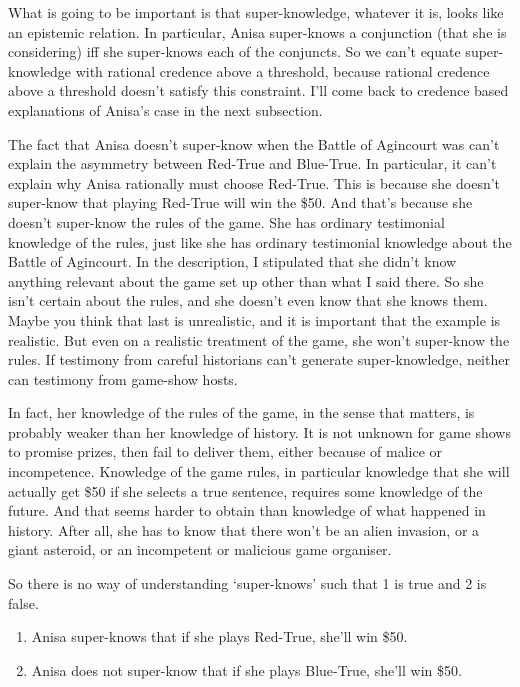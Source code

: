 \documentclass[
  11pt,
]{book}
\providecommand{\tightlist}{%
  \setlength{\itemsep}{0pt}\setlength{\parskip}{0pt}}
\begin{document}
What is going to be important is that super-knowledge, whatever it is, looks like an epistemic relation. In particular, Anisa super-knows a conjunction (that she is considering) iff she super-knows each of the conjuncts. So we can't equate super-knowledge with rational credence above a threshold, because rational credence above a threshold doesn't satisfy this constraint. I'll come back to credence based explanations of Anisa's case in the next subsection.

The fact that Anisa doesn't super-know when the Battle of Agincourt was can't explain the asymmetry between Red-True and Blue-True. In particular, it can't explain why Anisa rationally must choose Red-True. This is because she doesn't super-know that playing Red-True will win the \$50. And that's because she doesn't super-know the rules of the game. She has ordinary testimonial knowledge of the rules, just like she has ordinary testimonial knowledge about the Battle of Agincourt. In the description, I stipulated that she didn't know anything relevant about the game set up other than what I said there. So she isn't certain about the rules, and she doesn't even know that she knows them. Maybe you think that last is unrealistic, and it is important that the example is realistic. But even on a realistic treatment of the game, she won't super-know the rules. If testimony from careful historians can't generate super-knowledge, neither can testimony from game-show hosts.

In fact, her knowledge of the rules of the game, in the sense that matters, is probably weaker than her knowledge of history. It is not unknown for game shows to promise prizes, then fail to deliver them, either because of malice or incompetence. Knowledge of the game rules, in particular knowledge that she will actually get \$50 if she selects a true sentence, requires some knowledge of the future. And that seems harder to obtain than knowledge of what happened in history. After all, she has to know that there won't be an alien invasion, or a giant asteroid, or an incompetent or malicious game organiser.

So there is no way of understanding `super-knows' such that 1 is true and 2 is false.

\begin{enumerate}
\def\labelenumi{\arabic{enumi}.}
\tightlist
\item
  Anisa super-knows that if she plays Red-True, she'll win \$50.
\item
  Anisa does not super-know that if she plays Blue-True, she'll win \$50.
\end{enumerate}
\end{document}
